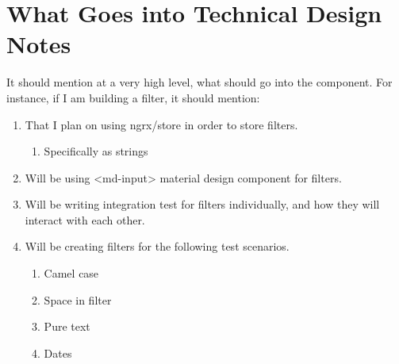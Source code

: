 \section{ What Goes into Technical Design Notes }
It should mention at a very high level, what should go into the component. For
instance, if I am building a filter, it should mention:
\begin{enumerate}
  \item That I plan on using ngrx/store in order to store filters.
    \begin{enumerate}
      \item Specifically as strings
    \end{enumerate}
  \item Will be using <md-input> material design component for filters.
  \item Will be writing integration test for filters individually, and how they
  will interact with each other.
  \item Will be creating filters for the following test scenarios.
    \begin{enumerate}
      \item Camel case
      \item Space in filter
      \item Pure text
      \item Dates
    \end{enumerate}
\end{enumerate}
